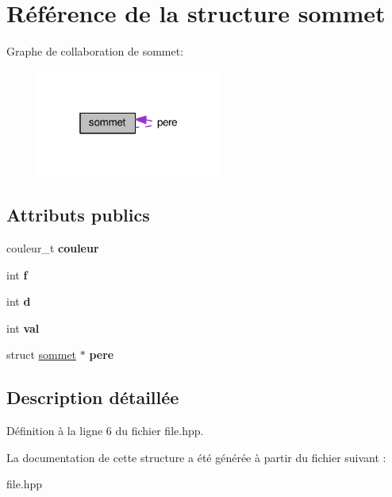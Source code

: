 \hypertarget{structsommet}{\section{Référence de la structure sommet}
\label{structsommet}
}


Graphe de collaboration de sommet\+:\nopagebreak
\begin{figure}[H]
\begin{center}
\leavevmode
\includegraphics[width=172pt]{structsommet__coll__graph}
\end{center}
\end{figure}
\subsection*{Attributs publics}
\begin{DoxyCompactItemize}
\item 
\hypertarget{structsommet_ae1cd921218c6cb425df68368e1eeef91}{couleur\+\_\+t {\bfseries couleur}}\label{structsommet_ae1cd921218c6cb425df68368e1eeef91}

\item 
\hypertarget{structsommet_ab118367f38ea1cfd0ea0d8c882823ed2}{int {\bfseries f}}\label{structsommet_ab118367f38ea1cfd0ea0d8c882823ed2}

\item 
\hypertarget{structsommet_a95a15dd5bd63851dd9a184881714c970}{int {\bfseries d}}\label{structsommet_a95a15dd5bd63851dd9a184881714c970}

\item 
\hypertarget{structsommet_a0fa328d5d0655b6367bb151f814031fe}{int {\bfseries val}}\label{structsommet_a0fa328d5d0655b6367bb151f814031fe}

\item 
\hypertarget{structsommet_af19efcb82032b6374c1b2c3521c855e1}{struct \hyperlink{structsommet}{sommet} $\ast$ {\bfseries pere}}\label{structsommet_af19efcb82032b6374c1b2c3521c855e1}

\end{DoxyCompactItemize}


\subsection{Description détaillée}


Définition à la ligne 6 du fichier file.\+hpp.



La documentation de cette structure a été générée à partir du fichier suivant \+:\begin{DoxyCompactItemize}
\item 
file.\+hpp\end{DoxyCompactItemize}

